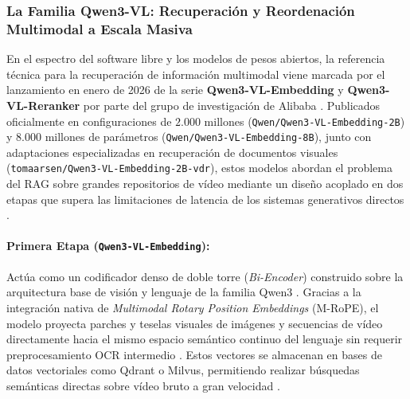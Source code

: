 \subsubsection{La Familia Qwen3-VL: Recuperación y Reordenación Multimodal a Escala Masiva}
\label{subsubsec:familia_qwen3_vl}

En el espectro del software libre y los modelos de pesos abiertos, la referencia técnica para la recuperación de información multimodal viene marcada por el lanzamiento en enero de 2026 de la serie \textbf{Qwen3-VL-Embedding} y \textbf{Qwen3-VL-Reranker} por parte del grupo de investigación de Alibaba \cite{qwen3_vl_emb2026, qwen3_vl_blog2026, qwen3_vl_github2026}. %
Publicados oficialmente en configuraciones de $2.000$ millones (\texttt{Qwen/Qwen3-VL-Embedding-2B}) y $8.000$ millones de parámetros (\texttt{Qwen/Qwen3-VL-Embedding-8B}), junto con adaptaciones especializadas en recuperación de documentos visuales (\texttt{tomaarsen/Qwen3-VL-Embedding-2B-vdr}), estos modelos abordan el problema del RAG sobre grandes repositorios de vídeo mediante un diseño acoplado en dos etapas que supera las limitaciones de latencia de los sistemas generativos directos \cite{qwen3_vl_emb2026, hf_qwen3_2b, hf_qwen3_8b, hf_qwen3_vdr}. %

\paragraph{Primera Etapa (\texttt{Qwen3-VL-Embedding}):}
Actúa como un codificador denso de doble torre (\textit{Bi-Encoder}) construido sobre la arquitectura base de visión y lenguaje de la familia Qwen3 \cite{qwen3_vl_emb2026, learnopencv_qwen3}. %
Gracias a la integración nativa de \textit{Multimodal Rotary Position Embeddings} (M-RoPE), el modelo proyecta parches y teselas visuales de imágenes y secuencias de vídeo directamente hacia el mismo espacio semántico continuo del lenguaje sin requerir preprocesamiento OCR intermedio \cite{prajwal2025multimodal, qwen3_vl_emb2026}. %
Estos vectores se almacenan en bases de datos vectoriales como Qdrant o Milvus, permitiendo realizar búsquedas semánticas directas sobre vídeo bruto a gran velocidad \cite{qwen3_vl_emb2026}. %

